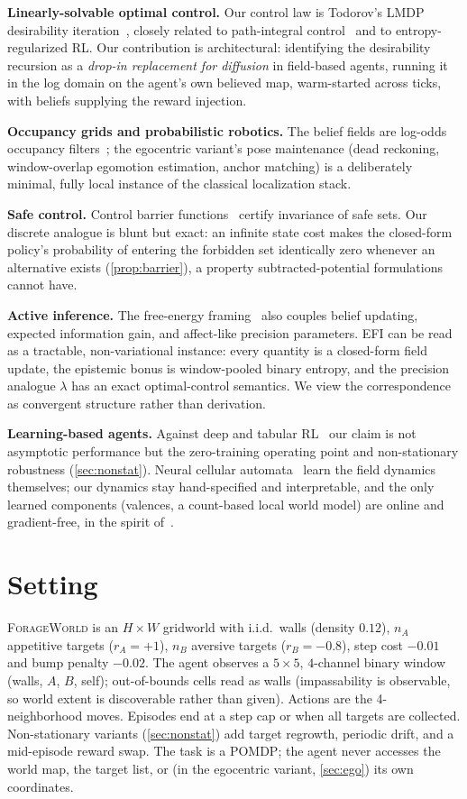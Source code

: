 \documentclass[11pt]{article}
\begin{document}
\textbf{Linearly-solvable optimal control.} Our control law is Todorov's LMDP desirability iteration~\citep{todorov2006,todorov2009}, closely related to path-integral control~\citep{kappen2005} and to entropy-regularized RL. Our contribution is architectural: identifying the desirability recursion as a \emph{drop-in replacement for diffusion} in field-based agents, running it in the log domain on the agent's own believed map, warm-started across ticks, with beliefs supplying the reward injection.

\textbf{Occupancy grids and probabilistic robotics.} The belief fields are log-odds occupancy filters~\citep{elfes1989,thrun2005}; the egocentric variant's pose maintenance (dead reckoning, window-overlap egomotion estimation, anchor matching) is a deliberately minimal, fully local instance of the classical localization stack.

\textbf{Safe control.} Control barrier functions~\citep{ames2017} certify invariance of safe sets. Our discrete analogue is blunt but exact: an infinite state cost makes the closed-form policy's probability of entering the forbidden set identically zero whenever an alternative exists (\cref{prop:barrier}), a property subtracted-potential formulations cannot have.

\textbf{Active inference.} The free-energy framing~\citep{friston2010} also couples belief updating, expected information gain, and affect-like precision parameters. EFI can be read as a tractable, non-variational instance: every quantity is a closed-form field update, the epistemic bonus is window-pooled binary entropy, and the precision analogue $\lambda$ has an exact optimal-control semantics. We view the correspondence as convergent structure rather than derivation.

\textbf{Learning-based agents.} Against deep and tabular RL~\citep{suttonbarto} our claim is not asymptotic performance but the zero-training operating point and non-stationary robustness (\cref{sec:nonstat}). Neural cellular automata~\citep{mordvintsev2020} learn the field dynamics themselves; our dynamics stay hand-specified and interpretable, and the only learned components (valences, a count-based local world model) are online and gradient-free, in the spirit of~\citet{brooks1991}.

\section{Setting}
\label{sec:setting}
\textsc{ForageWorld} is an $H{\times}W$ gridworld with i.i.d.\ walls (density $0.12$), $n_A$ appetitive targets ($r_A{=}{+}1$), $n_B$ aversive targets ($r_B{=}{-}0.8$), step cost $-0.01$ and bump penalty $-0.02$. The agent observes a $5{\times}5$, $4$-channel binary window (walls, $A$, $B$, self); out-of-bounds cells read as walls (impassability is observable, so world extent is discoverable rather than given). Actions are the 4-neighborhood moves. Episodes end at a step cap or when all targets are collected. Non-stationary variants (\cref{sec:nonstat}) add target regrowth, periodic drift, and a mid-episode reward swap. The task is a POMDP; the agent never accesses the world map, the target list, or (in the egocentric variant, \cref{sec:ego}) its own coordinates.
\end{document}
